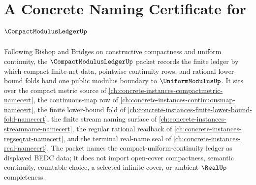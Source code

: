 \chapter{A Concrete Naming Certificate for $\CompactModulusLedgerUp$}
\label{ch:concrete-instances-compact-modulus-ledger-namecert}

Following Bishop and Bridges on constructive compactness and uniform continuity, the $\CompactModulusLedgerUp$ packet records the finite ledger by which compact finite-net data, pointwise continuity rows, and rational lower-bound folds hand one public modulus boundary to $\UniformModulusUp$. It sits over the compact metric source of \autoref{ch:concrete-instances-compactmetric-namecert}, the continuous-map row of \autoref{ch:concrete-instances-continuousmap-namecert}, the finite lower-bound fold of \autoref{ch:concrete-instances-finite-lower-bound-fold-namecert}, the finite stream naming surface of \autoref{ch:concrete-instances-streamname-namecert}, the regular rational readback of \autoref{ch:concrete-instances-regseqrat-namecert}, and the terminal real-name seal of \autoref{ch:concrete-instances-real-namecert}. The packet names the compact-uniform-continuity ledger as displayed BEDC data; it does not import open-cover compactness, semantic continuity, countable choice, a selected infinite cover, or ambient $\RealUp$ completeness.

